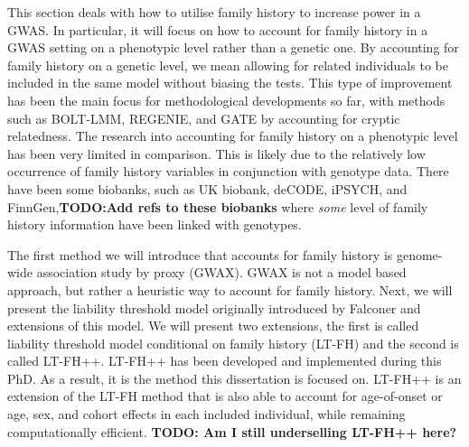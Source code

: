 
This section deals with how to utilise family history to increase power in a GWAS. In particular, it will focus on how to account for family history in a GWAS setting on a phenotypic level rather than a genetic one. By accounting for family history on a genetic level, we mean allowing for related individuals to be included in the same model without biasing the tests. This type of improvement has been the main focus for methodological developments so far, with methods such as BOLT-LMM\cite{loh2015efficient}, REGENIE\cite{mbatchou2021computationally}, and GATE\cite{dey2022efficient} by accounting for cryptic relatedness. The research into accounting for family history on a phenotypic level has been very limited in comparison. This is likely due to the relatively low occurrence of family history variables in conjunction with genotype data. There have been some biobanks, such as UK biobank, deCODE, iPSYCH, and FinnGen,\textbf{TODO:Add refs to these biobanks} where \textit{some} level of family history information have been linked with genotypes. 

The first method we will introduce that accounts for family history is genome-wide association study by proxy (GWAX)\cite{gwax}. GWAX is not a model based approach, but rather a heuristic way to account for family history. Next, we will present the liability threshold model originally introduced by Falconer\cite{falconer1965inheritance} and extensions of this model. We will present two extensions, the first is called liability threshold model conditional on family history (LT-FH)\cite{hujoel2020liability} and the second is called LT-FH++. LT-FH++ has been developed and implemented during this PhD. As a result, it is the method this dissertation is focused on. LT-FH++ is an extension of the LT-FH method that is also able to account for age-of-onset or age, sex, and cohort effects in each included individual, while remaining computationally efficient. \textbf{TODO: Am I still underselling LT-FH++ here?}

